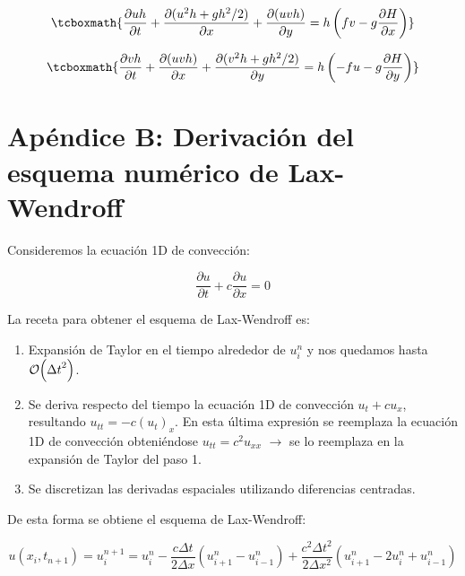 \documentclass[12pt,dvipsnames]{exam}
\begin{document}
\begin{equation*}
\tcboxmath{\frac{\partial u h}{\partial t} + \frac{\partial (u^{2} h + g h^{2}/2)}{\partial x} + \frac{\partial (u v h)}{\partial y} = h \left(f v - g \frac{\partial H}{\partial x}\right)}
\end{equation*}

\begin{equation*}
\tcboxmath{    \frac{\partial v h}{\partial t} + \frac{\partial (u v h)}{\partial x} + \frac{\partial (v^{2} h + g h^{2}/2)}{\partial y}  = h \left(-f u - g \frac{\partial H}{\partial y}\right)}
\end{equation*}

\section{Apéndice B: Derivación del esquema numérico de Lax-Wendroff}

Consideremos la ecuación 1D de convección:
\begin{center}
\begin{equation*}
\dfrac{\partial u}{\partial t} + c \dfrac{\partial u}{\partial x} = 0
\end{equation*}
\end{center}
La receta para obtener el esquema de Lax-Wendroff es:
\begin{enumerate}
    \item Expansión de Taylor en el tiempo alrededor de $u_{i}^{n}$ y nos quedamos hasta $\order{{\Delta t}^{2}}$.
    \item Se deriva respecto del tiempo la ecuación 1D de convección $u_{t} + c u_{x}$, resultando $u_{tt} = - c (u_{t})_{x}$. En esta última expresión se reemplaza la ecuación 1D de convección obteniéndose $u_{tt} = c^{2} u_{xx}$ $\xrightarrow{}$ se lo reemplaza en la expansión de Taylor del paso 1.
    \item Se discretizan las derivadas espaciales utilizando diferencias centradas.
\end{enumerate}

De esta forma se obtiene el esquema de Lax-Wendroff:

\begin{equation*}
    u(x_{i},t_{n+1})=u_{i}^{n+1}=u_{i}^{n}-\dfrac{c\Delta t}{2\Delta x}(u_{i+1}^{n}-u_{i-1}^{n})+\dfrac{c^2\Delta t^2}{2\Delta x^2}(u_{i+1}^{n}-2u_{i}^{n}+u_{i-1}^{n})
\end{equation*}
\end{document}
